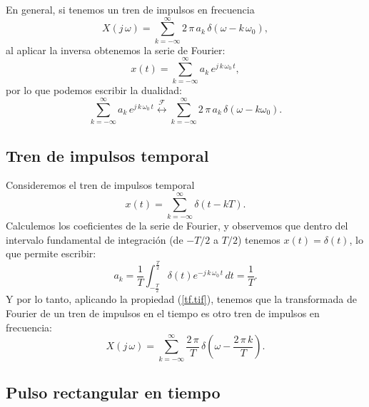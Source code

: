 En general, si tenemos un tren de impulsos en frecuencia
\begin{equation}
	X(j \, \omega) = \sum_{k=-\infty}^{\infty} 2 \, \pi \, a_{k} \, \delta(\omega - k \, \omega_{0}) ,
\end{equation}
al aplicar la inversa obtenemos la serie de Fourier:
\begin{equation}
	x(t) = \sum_{k=-\infty}^{\infty} a_{k} \, e^{j \, k \, \omega_{0} \, t},
\end{equation}
por lo que podemos escribir la dualidad:
\begin{equation}
	\sum_{k=-\infty}^{\infty} a_{k} \, e^{j \, k \, \omega_{0} \, t} 
	\stackrel{\mathcal{F}}{\longleftrightarrow}
	\sum_{k=-\infty}^{\infty} 2 \, \pi \, a_{k} \, \delta(\omega - k \omega_{0}). \label{tf.tif}
\end{equation}

\subsection{Tren de impulsos temporal}

Consideremos el tren de impulsos temporal
\begin{equation}
	x(t) = \sum_{k=-\infty}^{\infty} \delta(t - kT) .
\end{equation}
Calculemos los coeficientes de la serie de Fourier, y observemos que dentro del intervalo fundamental de integración (de $-T/2$ a $T/2$) tenemos $x(t) = \delta(t)$, lo que permite escribir:
\begin{equation}
	a_{k} = \frac{1}{T} \int_{-\frac{T}{2}}^{\frac{T}{2}} \delta(t) e^{-j \, k \, \omega_{0} \, t} \, dt = \frac{1}{T}.
\end{equation}
Y por lo tanto, aplicando la propiedad (\ref{tf.tif}), tenemos que la transformada de Fourier de un tren de impulsos en el tiempo es otro tren de impulsos en frecuencia:
\begin{equation}
	X(j \, \omega) = \sum_{k=-\infty}^{\infty} \frac{2 \, \pi}{T} \, \delta\left(\omega - \frac{2 \, \pi \, k}{T}\right).
\end{equation}

\subsection{Pulso rectangular en tiempo}


